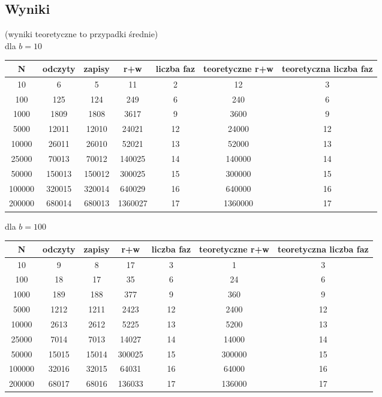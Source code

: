 \documentclass{article}
\begin{document}
\subsection{Wyniki}
(wyniki teoretyczne to przypadki średnie) \\
dla $b=10$
\begin{center}
\begin{tabular}{ c | c c c c | c c}
 N & odczyty & zapisy & r+w & liczba faz & teoretyczne r+w & teoretyczna liczba faz\\ 
\hline
 10 & 6 & 5 & 11 & 2 & 12 & 3\\  
 100 & 125 & 124 & 249 & 6 & 240 & 6 \\
 1000 & 1809 & 1808 & 3617 & 9 & 3600 & 9\\
 5000 & 12011 & 12010 & 24021 & 12 & 24000 & 12\\
 10000 & 26011 & 26010 & 52021 & 13 & 52000 & 13 \\
 25000 & 70013 & 70012 & 140025 & 14 & 140000 & 14 \\
 50000 & 150013 & 150012 & 300025 & 15 & 300000 & 15\\
 100000 & 320015 & 320014 & 640029 & 16 & 640000 & 16\\
 200000 & 680014 & 680013 & 1360027 & 17 & 1360000 & 17\\
\end{tabular}
\end{center}
dla $b=100$
\begin{center}
\begin{tabular}{ c | c c c c | c c }
 N & odczyty & zapisy & r+w & liczba faz & teoretyczne r+w & teoretyczna liczba faz \\ 
\hline
 10 & 9 & 8 & 17 & 3 & 1 & 3\\  
 100 & 18 & 17 & 35 & 6 & 24 & 6 \\
 1000 & 189 & 188 & 377 & 9 & 360 & 9\\
 5000 & 1212 & 1211 & 2423 & 12 & 2400 & 12\\
 10000 & 2613 & 2612 & 5225 & 13 & 5200 & 13 \\
 25000 & 7014 & 7013 & 14027 & 14 & 14000 & 14 \\
 50000 & 15015 & 15014 & 300025 & 15 & 300000 & 15\\
 100000 & 32016 & 32015 & 64031 & 16 & 64000 & 16\\
 200000 & 68017 & 68016 & 136033 & 17 & 136000 & 17\\
\end{tabular}
\end{center}
\end{document}
